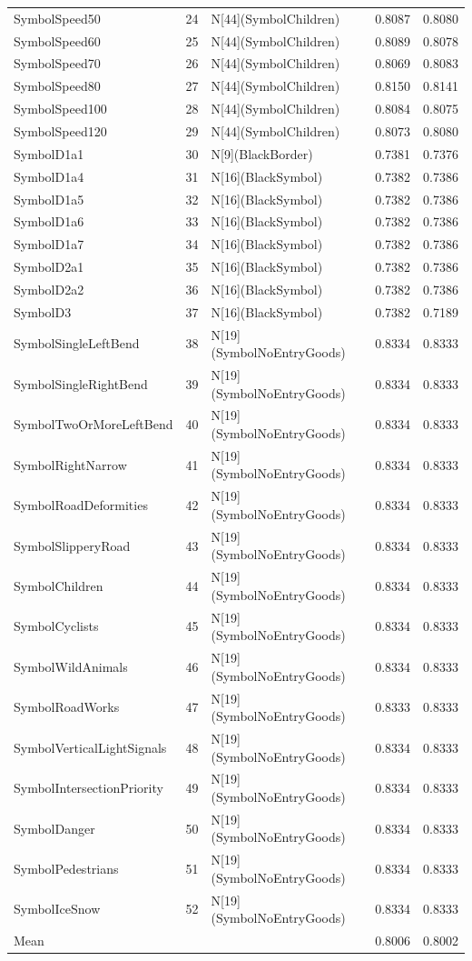 \begin{tabular}{lllll}
SymbolSpeed50 & 24 & N[44](SymbolChildren) & 0.8087 & 0.8080 \\
SymbolSpeed60 & 25 & N[44](SymbolChildren) & 0.8089 & 0.8078 \\
SymbolSpeed70 & 26 & N[44](SymbolChildren) & 0.8069 & 0.8083 \\
SymbolSpeed80 & 27 & N[44](SymbolChildren) & 0.8150 & 0.8141 \\
SymbolSpeed100 & 28 & N[44](SymbolChildren) & 0.8084 & 0.8075 \\
SymbolSpeed120 & 29 & N[44](SymbolChildren) & 0.8073 & 0.8080 \\
SymbolD1a1 & 30 & N[9](BlackBorder) & 0.7381 & 0.7376 \\
SymbolD1a4 & 31 & N[16](BlackSymbol) & 0.7382 & 0.7386 \\
SymbolD1a5 & 32 & N[16](BlackSymbol) & 0.7382 & 0.7386 \\
SymbolD1a6 & 33 & N[16](BlackSymbol) & 0.7382 & 0.7386 \\
SymbolD1a7 & 34 & N[16](BlackSymbol) & 0.7382 & 0.7386 \\
SymbolD2a1 & 35 & N[16](BlackSymbol) & 0.7382 & 0.7386 \\
SymbolD2a2 & 36 & N[16](BlackSymbol) & 0.7382 & 0.7386 \\
SymbolD3 & 37 & N[16](BlackSymbol) & 0.7382 & 0.7189 \\
SymbolSingleLeftBend & 38 & N[19](SymbolNoEntryGoods) & 0.8334 & 0.8333 \\
SymbolSingleRightBend & 39 & N[19](SymbolNoEntryGoods) & 0.8334 & 0.8333 \\
SymbolTwoOrMoreLeftBend & 40 & N[19](SymbolNoEntryGoods) & 0.8334 & 0.8333 \\
SymbolRightNarrow & 41 & N[19](SymbolNoEntryGoods) & 0.8334 & 0.8333 \\
SymbolRoadDeformities & 42 & N[19](SymbolNoEntryGoods) & 0.8334 & 0.8333 \\
SymbolSlipperyRoad & 43 & N[19](SymbolNoEntryGoods) & 0.8334 & 0.8333 \\
SymbolChildren & 44 & N[19](SymbolNoEntryGoods) & 0.8334 & 0.8333 \\
SymbolCyclists & 45 & N[19](SymbolNoEntryGoods) & 0.8334 & 0.8333 \\
SymbolWildAnimals & 46 & N[19](SymbolNoEntryGoods) & 0.8334 & 0.8333 \\
SymbolRoadWorks & 47 & N[19](SymbolNoEntryGoods) & 0.8333 & 0.8333 \\
SymbolVerticalLightSignals & 48 & N[19](SymbolNoEntryGoods) & 0.8334 & 0.8333 \\
SymbolIntersectionPriority & 49 & N[19](SymbolNoEntryGoods) & 0.8334 & 0.8333 \\
SymbolDanger & 50 & N[19](SymbolNoEntryGoods) & 0.8334 & 0.8333 \\
SymbolPedestrians & 51 & N[19](SymbolNoEntryGoods) & 0.8334 & 0.8333 \\
SymbolIceSnow & 52 & N[19](SymbolNoEntryGoods) & 0.8334 & 0.8333 \\
Mean &  &  & 0.8006 & 0.8002 \\
\bottomrule
\end{tabular}
